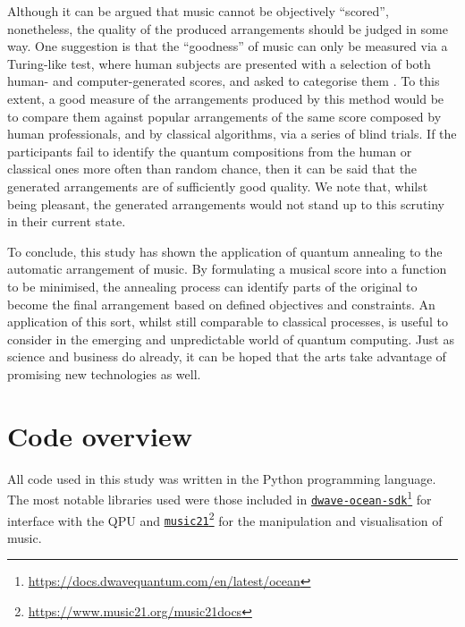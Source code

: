 \documentclass[twocolumn]{article}
\theoremstyle{definition}
\begin{document}
Although it can be argued that music cannot be objectively ``scored'', nonetheless, the quality of the produced arrangements should be judged in some way. One suggestion is that the ``goodness'' of music can only be measured via a Turing-like test, where human subjects are presented with a selection of both human- and computer-generated scores, and asked to categorise them \cite{pearce_towards_2001}. To this extent, a good measure of the arrangements produced by this method would be to compare them against popular arrangements of the same score composed by human professionals, and by classical algorithms, via a series of blind trials. If the participants fail to identify the quantum compositions from the human or classical ones more often than random chance, then it can be said that the generated arrangements are of sufficiently good quality. We note that, whilst being pleasant, the generated arrangements would not stand up to this scrutiny in their current state.

To conclude, this study has shown the application of quantum annealing to the automatic arrangement of music. By formulating a musical score into a function to be minimised, the annealing process can identify parts of the original to become the final arrangement based on defined objectives and constraints. An application of this sort, whilst still comparable to classical processes, is useful to consider in the emerging and unpredictable world of quantum computing. Just as science and business do already, it can be hoped that the arts take advantage of promising new technologies as well.

\printbibliography[heading=bibintoc,block=space]

\onecolumn
\appendix
{}

\section{Code overview}
\label{app:code}

All code used in this study was written in the Python programming language. The most notable libraries used were those included in \href{https://docs.dwavequantum.com/en/latest/ocean}{\texttt{dwave-ocean-sdk}}\footnote{\url{https://docs.dwavequantum.com/en/latest/ocean}} for interface with the QPU and \href{https://www.music21.org/music21docs}{\texttt{music21}}\footnote{\url{https://www.music21.org/music21docs}} for the manipulation and visualisation of music.
\end{document}
